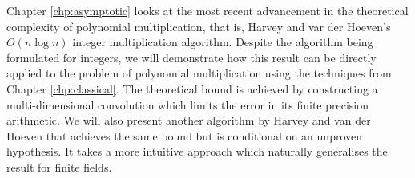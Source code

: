 Chapter \ref{chp:asymptotic} looks at the most recent advancement in the theoretical complexity of polynomial multiplication, that is, Harvey and var der Hoeven's $O(n \log n)$ integer multiplication algorithm. Despite the algorithm \cite{nlogn} being formulated for integers, we will demonstrate how this result can be directly applied to the problem of polynomial multiplication using the techniques from Chapter \ref{chp:classical}. The theoretical bound is achieved by constructing a multi-dimensional convolution which limits the error in its finite precision arithmetic. We will also present another algorithm by Harvey and van der Hoeven that achieves the same bound but is conditional on an unproven hypothesis. It takes a more intuitive approach which naturally generalises the result for finite fields.
